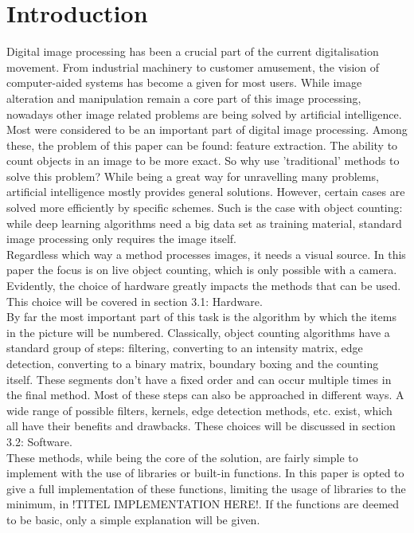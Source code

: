 \documentclass[11pt]{article}
\begin{document}




\newpage
\tableofcontents
\thispagestyle{empty}


\newpage
\listoffigures
\thispagestyle{empty}

\newpage
\section{Introduction}
Digital image processing has been a crucial part of the current digitalisation movement. From industrial machinery to customer amusement, the vision of computer-aided systems has become a given for most users. While image alteration and manipulation remain a core part of this image processing, nowadays other image related problems are being solved by artificial intelligence. Most were considered to be an important part of digital image processing. Among these, the problem of this paper can be found: feature extraction. The ability to count objects in an image to be more exact. So why use 'traditional' methods to solve this problem? While being a great way for unravelling many problems, artificial intelligence mostly provides general solutions. However, certain cases are solved more efficiently by specific schemes. Such is the case with object counting: while deep learning algorithms need a big data set as training material, standard image processing only requires the image itself.\\
Regardless which way a method processes images, it needs a visual source. In this paper the focus is on live object counting, which is only possible with a camera. Evidently, the choice of hardware greatly impacts the methods that can be used. This choice will be covered in section 3.1: Hardware.\\
By far the most important part of this task is the algorithm by which the items in the picture will be numbered. Classically, object counting algorithms have a standard group of steps: filtering, converting to an intensity matrix, edge detection, converting to a binary matrix, boundary boxing and the counting itself. These segments don't have a fixed order and can occur multiple times in the final method. Most of these steps can also be approached in different ways. A wide range of possible filters, kernels, edge detection methods, etc. exist, which all have their benefits and drawbacks\cite{dirac}. These choices will be discussed in section 3.2: Software.\\
These methods, while being the core of the solution, are fairly simple to implement with the use of libraries or built-in functions. In this paper is opted to give a full implementation of these functions, limiting the usage of libraries to the minimum, in !TITEL IMPLEMENTATION HERE!. If the functions are deemed to be basic, only a simple explanation will be given.
\end{document}
